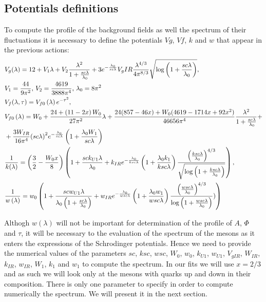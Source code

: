 \documentclass[10 pt]{article}
\begin{document}
\subsection{Potentials definitions}

To compute the profile of the background fields as well the spectrum of their fluctuations it is necessary to define the potentials $Vg$, $Vf$, $k$ and $w$ that appear in the previous actions:
\begin{align}
&V_g(\lambda) = 12 + V_1 \lambda + V_2 \frac{\lambda^2}{1 + \frac{sc \lambda}{\lambda_0}} + 3 e^{-\frac{\lambda_0}{sc \lambda}} V_gIR \frac{\lambda^{4/3}}{4 \pi^{8/3}}\sqrt{\log\left(1+\frac{sc \lambda}{\lambda_0}\right)}, \\ \notag
& V_1 = \frac{44}{9 \pi^2}, \, V_2 = \frac{4619}{3888 \pi^4}, \, \lambda_0 = 8 \pi^2 \\
& V_f(\lambda, \tau) = V_{f0} \left(\lambda\right) e^{-\tau^2}, \\ \notag
& V_{f0}\left(\lambda\right) = W_0 + \frac{24 + \left(11- 2 x\right) W_0}{27 \pi^2} \lambda + \frac{24 (857 - 46 x) + W_0 (4619 - 1714 x + 92 x^2)}{46656 \pi^4} \frac{\lambda^2}{1+ \frac{sc \lambda}{\lambda_0}} + \\ \notag
& + \frac{3 W_{IR}}{16 \pi^4} {\left(sc \lambda \right)}^2 e^{- \frac{\lambda_0}{sc \lambda}} \left( 1 + \frac{\lambda_0 W_1}{sc \lambda}\right) \\
& \frac{1}{k(\lambda)} =  \left( \frac{3}{2} - \frac{W_0 x}{8} \right) \left( 1+ \frac{sc k_{U1} \lambda}{\lambda_0} + k_{IR} e^{-\frac{\lambda_0}{ksc \lambda}} \left( 1 + \frac{\lambda_0 k_1}{ksc \lambda}\right) \frac{{\left(\frac{ksc \lambda}{\lambda_0}\right)}^{4/3}}{\sqrt{\log\left(1 + \frac{ksc \lambda}{\lambda_0}\right)}}\right), \\
& \frac{1}{w\left(\lambda\right)} = w_0 \left(1 + \frac{sc w_{U1} \lambda}{\lambda_0 \left( 1+ \frac{sc \lambda}{\lambda_0}\right)} + w_{IR} e^{- \frac{\lambda_0}{wsc \lambda}} \left(1+\frac{\lambda_0 w_1}{wsc \lambda}\right)\frac{{\left( \frac{wsc \lambda}{\lambda_0}\right)}^{4/3}}{\log\left(1+\frac{wsc \lambda}{\lambda_0}\right)}) \right)
\end{align}

Althogh $w\left(\lambda\right)$ will not be important for determination of the profile of $A$, $\Phi$ and $\tau$, it will be necessary to the evaluation of the spectrum of the mesons as it enters the expressions of the Schrodinger potentials.  Hence we need to provide the numerical values of the parameters $sc$, $ksc$, $wsc$, $W_0$, $w_0$, $k_{U1}$, $w_{U1}$, $V_{gIR}$, $W_{IR}$, $k_{IR}$,  $w_{IR}$, $W_1$, $k_1$ and $w_1$ to compute the spectrum. In our fits we will use $x = 2/3$ and as such we will look only at the mesons with quarks up and down in their composition. There is only one parameter to specify in order to compute numerically the spectrum. We will present it in the next section.
\end{document}

